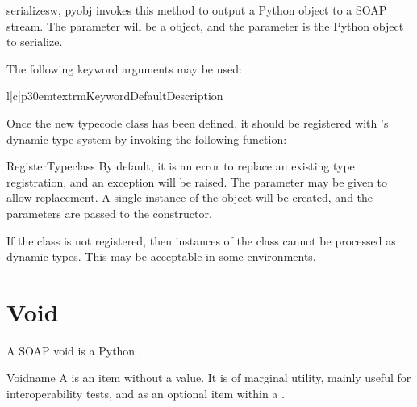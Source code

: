 \begin{methoddesc}{serialize}{sw, pyobj}
\ZSI{} invokes this method to output a Python object to a SOAP stream.
The  parameter will be a  object, and
the  parameter is the Python object to serialize.

The following keyword arguments may be used:

\begin{tableiii}{l|c|p{30em}}{textrm}{Keyword}{Default}{Description}
\end{tableiii}
\end{methoddesc}

Once the new typecode class has been defined, it should be registered with
\ZSI{}'s dynamic type system by invoking the following function:

\begin{funcdesc}{RegisterType}{class}
By default, it is an error to replace an existing type registration, and
an exception will be raised.
The  parameter may be given to allow replacement.
A single instance of the  object will be created, and
the  parameters are passed to the constructor.
\end{funcdesc}

If the class is not registered, then instances of the class cannot be
processed as dynamic types.
This may be acceptable in some environments.

\section{Void}

A SOAP void is a Python .

\begin{classdesc}{Void}{name}
A  is an item without a value.
It is of marginal utility, mainly useful for interoperability tests, and
as an optional item within a .
\end{classdesc}

